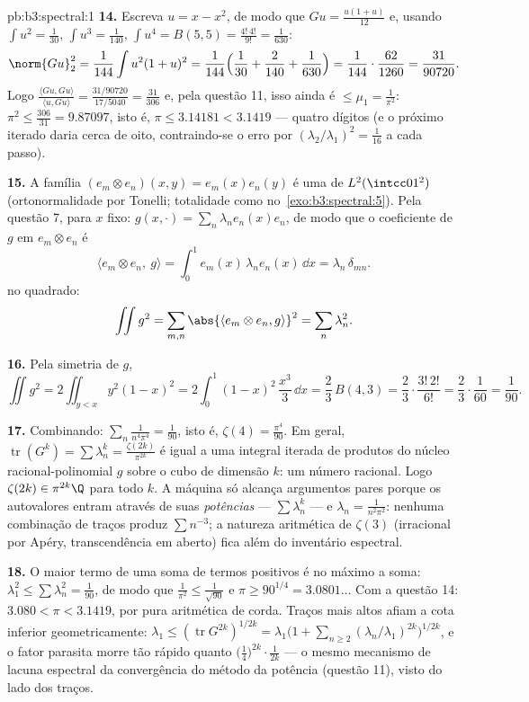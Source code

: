 \begin{solution}{pb:b3:spectral:1}
\textbf{14.} Escreva $u = x - x^2$, de modo que $Gu =
\frac{u(1 + u)}{12}$ e, usando $\int u^2 = \frac1{30}$,
$\int u^3 = \frac1{140}$, $\int u^4 = B(5,5) =
\frac{4!\,4!}{9!} = \frac1{630}$:
\[
\norm{Gu}_2^2 = \frac1{144}\int u^2(1+u)^2 =
\frac1{144}\Bigl(\frac1{30} + \frac2{140} +
\frac1{630}\Bigr) = \frac1{144}\cdot\frac{62}{1260} =
\frac{31}{90720} .
\]
Logo $\frac{\langle Gu, Gu\rangle}{\langle u, Gu\rangle} =
\frac{31/90720}{17/5040} = \frac{31}{306}$ e, pela questão
11, isso ainda é $\leq \mu_1 = \frac1{\pi^2}$: $\pi^2 \leq
\frac{306}{31} = 9.87097$, isto é, $\pi \leq 3.14181 <
3.1419$ --- quatro dígitos (e o próximo iterado daria
cerca de oito, contraindo-se o erro por
$(\lambda_2/\lambda_1)^2 = \frac1{16}$ a cada passo).

\textbf{15.} A família $(e_m \otimes e_n)(x,y) =
e_m(x)e_n(y)$ é uma  de $L^2(\intcc01^2)$
(ortonormalidade por Tonelli; totalidade como no~\cref{exo:b3:spectral:5}). Pela questão 7, para $x$ fixo:
$g(x, \cdot) = \sum_n\lambda_ne_n(x)e_n$, de modo que o coeficiente
de $g$ em $e_m\otimes e_n$ é
\[
\langle e_m\otimes e_n,\ g\rangle
= \int_0^1 e_m(x)\,\lambda_n e_n(x)\,\dd x
= \lambda_n\,\delta_{mn} .
\]
 no quadrado:
\[
\iint g^2 = \sum_{m,n}\abs{\langle e_m\otimes e_n,
g\rangle}^2 = \sum_n\lambda_n^2 .
\]

\textbf{16.} Pela simetria de $g$,
\[
\iint g^2 = 2\iint_{y<x}y^2(1-x)^2
= 2\int_0^1(1-x)^2\,\frac{x^3}3\,\dd x
= \frac23\,B(4, 3) = \frac23\cdot\frac{3!\,2!}{6!}
= \frac23\cdot\frac1{60} = \frac1{90} .
\]

\textbf{17.} Combinando: $\sum_n\frac1{n^4\pi^4} =
\frac1{90}$, isto é, $\zeta(4) = \frac{\pi^4}{90}$. Em
geral, $\operatorname{tr}(G^k) = \sum\lambda_n^k =
\frac{\zeta(2k)}{\pi^{2k}}$ é igual a uma integral iterada de
produtos do núcleo racional-polinomial $g$ sobre o
cubo de dimensão $k$: um número racional. Logo $\zeta(2k) \in
\pi^{2k}\Q$ para todo $k$. A máquina só alcança argumentos
pares porque os autovalores entram através de suas
\emph{potências} --- $\sum\lambda_n^k$ --- e $\lambda_n =
\frac1{n^2\pi^2}$: nenhuma combinação de traços produz $\sum
n^{-3}$; a natureza aritmética de $\zeta(3)$ (irracional por
Apéry, transcendência em aberto) fica além do inventário
espectral.

\textbf{18.} O maior termo de uma soma de termos positivos é no
máximo a soma: $\lambda_1^2 \leq \sum\lambda_n^2 =
\frac1{90}$, de modo que $\frac1{\pi^2} \leq \frac1{\sqrt{90}}$ e
$\pi \geq 90^{1/4} = 3.0801\ldots$ Com a questão 14:
$3.080 < \pi < 3.1419$, por pura aritmética de corda. Traços
mais altos afiam a cota inferior geometricamente:
$\lambda_1 \leq (\operatorname{tr}G^{2k})^{1/2k} =
\lambda_1\bigl(1 + \sum_{n\geq2}(\lambda_n/\lambda_1)^{2k}
\bigr)^{1/2k}$, e o fator parasita morre tão rápido quanto
$\bigl(\tfrac14\bigr)^{2k}\cdot\frac1{2k}$ --- o mesmo
mecanismo de lacuna espectral da convergência do método da potência
(questão 11), visto do lado dos traços.


\end{solution}

